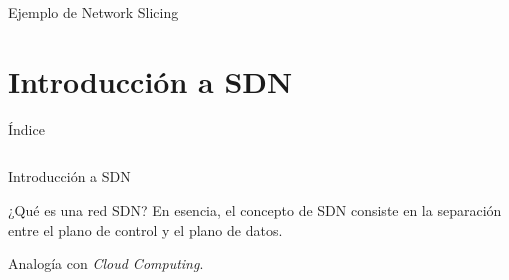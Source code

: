 \documentclass{beamer}
\begin{document}
\begin{frame}{Ejemplo de Network Slicing}
    \begin{figure}
    \end{figure}
\end{frame}

\section{Introducción a SDN}
\begin{frame}{Índice}
    \begin{columns}[t]
        \begin{column}{1.7in}
            \tableofcontents[currentsection, hideallsubsections, sections={1-4}]
        \end{column}
        \begin{column}{1.7in}
            \tableofcontents[currentsection, hideallsubsections, sections={5-7}]
        \end{column}
    \end{columns}
\end{frame}

\begin{frame}{Introducción a SDN}
   \begin{block}{¿Qué es una red SDN?}
        En esencia, el concepto de SDN consiste en la separación entre el plano de control y el plano de datos.
   \end{block}
   \vspace{10pt}
   Analogía con \alert{\textit{Cloud Computing}}.
\end{frame}
\end{document}

